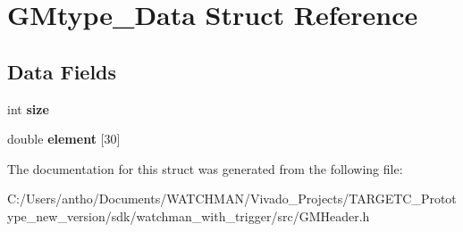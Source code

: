 \section{G\+Mtype\+\_\+\+Data Struct Reference}
\label{struct_g_mtype___data}
\subsection*{Data Fields}
\begin{DoxyCompactItemize}
\item 
\mbox{\label{struct_g_mtype___data_a439227feff9d7f55384e8780cfc2eb82}} 
int {\bfseries size}
\item 
\mbox{\label{struct_g_mtype___data_abccce14669ca0e42eeedbdc77f604ca9}} 
double {\bfseries element} [30]
\end{DoxyCompactItemize}


The documentation for this struct was generated from the following file\+:\begin{DoxyCompactItemize}
\item 
C\+:/\+Users/antho/\+Documents/\+W\+A\+T\+C\+H\+M\+A\+N/\+Vivado\+\_\+\+Projects/\+T\+A\+R\+G\+E\+T\+C\+\_\+\+Prototype\+\_\+new\+\_\+version/sdk/watchman\+\_\+with\+\_\+trigger/src/G\+M\+Header.\+h\end{DoxyCompactItemize}
